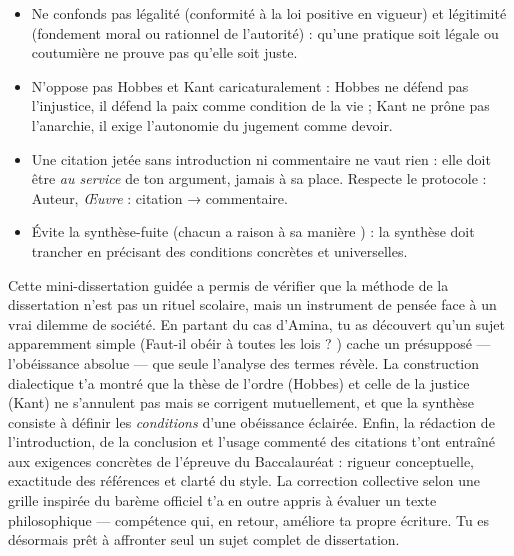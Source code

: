 \documentclass[11pt]{article}
\newcommand{\cle}[1]{{\popxbold\color{popdark}#1}}
\newcounter{popsec}
\newcounter{popsub}
\newcommand{\courssub}[1]{%
  \stepcounter{popsub}%
  \par\vspace{9pt}\noindent{\popxbold\fontsize{11.5}{13}\selectfont\color{popink}{\color{poporange}\thepopsec.\thepopsub}\hspace{6pt}#1}\par\nopagebreak\vspace{4pt}
}
\begin{document}
\begin{attention}
\begin{itemize}
\item Ne confonds pas \cle{légalité} (conformité à la loi positive en vigueur) et \cle{légitimité} (fondement moral ou rationnel de l'autorité) : qu'une pratique soit légale ou coutumière ne prouve pas qu'elle soit juste.
\item N'oppose pas Hobbes et Kant caricaturalement : Hobbes ne défend pas l'injustice, il défend la paix comme condition de la vie ; Kant ne prône pas l'anarchie, il exige l'autonomie du jugement comme devoir.
\item Une citation jetée sans introduction ni commentaire ne vaut rien : elle doit être \emph{au service} de ton argument, jamais à sa place. Respecte le protocole : \guillemotleft Auteur, \emph{Œuvre} \guillemotright : \guillemotleft citation \guillemotright → commentaire.
\item Évite la synthèse-fuite (\guillemotleft chacun a raison à sa manière \guillemotright) : la synthèse doit trancher en précisant des conditions concrètes et universelles.
\end{itemize}
\end{attention}

\courssub{Bilan de l'activité}

Cette mini-dissertation guidée a permis de vérifier que la méthode de la dissertation n'est pas un rituel scolaire, mais un instrument de pensée face à un vrai dilemme de société. En partant du cas d'Amina, tu as découvert qu'un sujet apparemment simple (\guillemotleft Faut-il obéir à toutes les lois ? \guillemotright) cache un présupposé — l'obéissance absolue — que seule l'analyse des termes révèle. La construction dialectique t'a montré que la thèse de l'ordre (Hobbes) et celle de la justice (Kant) ne s'annulent pas mais se corrigent mutuellement, et que la synthèse consiste à définir les \emph{conditions} d'une obéissance éclairée. Enfin, la rédaction de l'introduction, de la conclusion et l'usage commenté des citations t'ont entraîné aux exigences concrètes de l'épreuve du Baccalauréat : rigueur conceptuelle, exactitude des références et clarté du style. La correction collective selon une grille inspirée du barème officiel t'a en outre appris à évaluer un texte philosophique — compétence qui, en retour, améliore ta propre écriture. Tu es désormais prêt à affronter seul un sujet complet de dissertation.

\newpage
\end{document}
